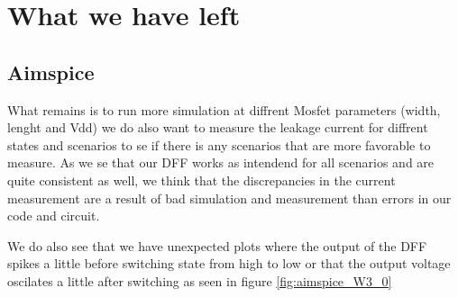 \section{What we have left}

\subsection{Aimspice}
What remains is to run more simulation at diffrent Mosfet parameters (width, lenght and Vdd) we do also want to measure the leakage current for diffrent states and scenarios to se if there is any scenarios that are more favorable to measure. As we se that our DFF works as intendend for all scenarios and are quite consistent as well, we think that the discrepancies in the current measurement are a result of bad simulation and measurement than errors in our code and circuit.

We do also see that we have unexpected plots where the output of the DFF spikes a little before switching state from high to low or that the output voltage oscilates a little after switching as seen in figure \ref{fig:aimspice_W3_0}


